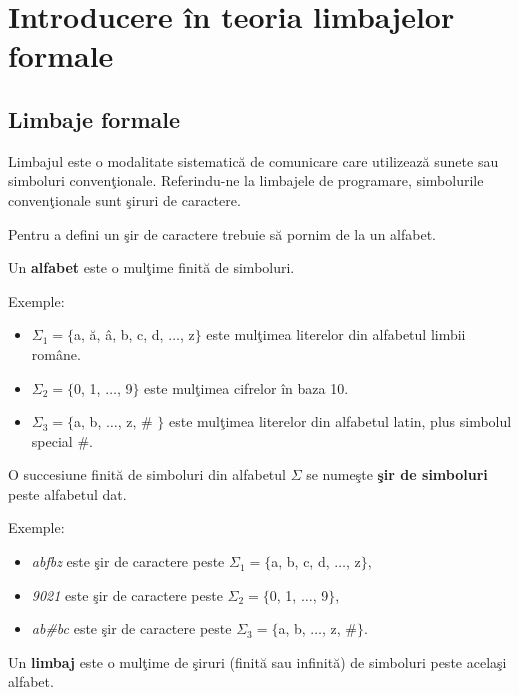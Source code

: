 \chapter{Introducere în teoria limbajelor formale}
\label{ch:introducere}

\section{Limbaje formale}

Limbajul este o modalitate sistematică de comunicare care utilizează sunete sau simboluri convenţionale. Referindu-ne la limbajele de programare, simbolurile convenţionale sunt şiruri de caractere.

Pentru a defini un şir de caractere trebuie să pornim de la un alfabet.

\begin{definitie}
Un \textbf{alfabet} este o mulţime finită de simboluri.
\end{definitie}

Exemple:
\begin{itemize}
\item
$\Sigma_{1} = \{$a, ă, â, b, c, d, $\dots$, z$\}$ este mulţimea literelor din alfabetul limbii române.
\item
$\Sigma_{2} = \{$0, 1, $\dots$, 9$\}$ este mulţimea cifrelor în baza 10.
\item
$\Sigma_{3} = \{$a, b, $\dots$, z, \# $\}$ este mulţimea literelor din alfabetul latin, plus simbolul special $\#$.
\end{itemize}

\begin{definitie}
O succesiune finită de simboluri din alfabetul $\Sigma$ se numeşte \textbf{şir de simboluri} peste alfabetul dat.
\end{definitie}

Exemple:
\begin{itemize}
\item
\textit{abfbz} este şir de caractere peste $\Sigma_{1} = \{$a, b, c, d, $\dots$, z$\}$,
\item
\textit{9021} este şir de caractere peste $\Sigma_{2} = \{$0, 1, $\dots$, 9$\}$,
\item
\textit{ab\#bc} este şir de caractere peste $\Sigma_{3} = \{$a, b, $\dots$, z, \#$\}$.
\end{itemize}

\begin{definitie}
Un \textbf{limbaj} este o mulţime de şiruri (finită sau infinită) de simboluri peste acelaşi alfabet.
\end{definitie}

